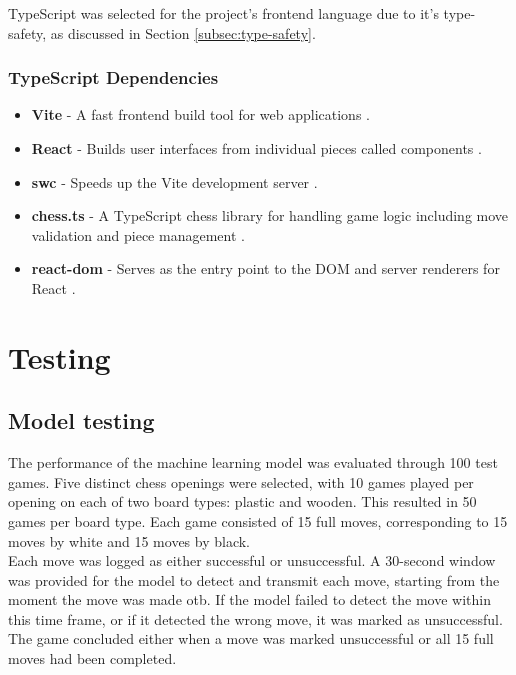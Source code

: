 TypeScript was selected for the project's frontend language due to it's type-safety, as discussed in Section \ref{subsec:type-safety}.

\subsubsection*{TypeScript Dependencies}

\begin{itemize}
    \item \textbf{Vite} - A fast frontend build tool for web applications \cite{ts:vite}.
    
    \item \textbf{React} - Builds user interfaces from individual pieces called components \cite{ts:react}.
    
    \item \textbf{\acrshort{swc}} - Speeds up the Vite development server \cite{ts:swc}.
    
    \item \textbf{chess.ts} - A TypeScript chess library for handling game logic including move validation and piece management \cite{ts:chess}.
    
    \item \textbf{react-dom} - Serves as the entry point to the DOM and server renderers for React \cite{ts:react-dom}.
\end{itemize}

\newpage

\section{Testing}
\label{sec:testing}

\subsection{Model testing}
\label{subsec:model-testing}
The performance of the machine learning model was evaluated through 100 test  games. Five distinct chess openings were selected, with 10 games played per opening on each of two board types: plastic and wooden. This resulted in 50 games per board type. Each game consisted of 15 full moves, corresponding to 15 moves by white and 15 moves by black. \\

Each move was logged as either successful or unsuccessful. A 30-second window was provided for the model to detect and transmit each move, starting from the moment the move was made \gls{otb}. If the model failed to detect the move within this time frame, or if it detected the wrong move, it was marked as unsuccessful. The game concluded either when a move was marked unsuccessful or all 15 full moves had been completed. \\

